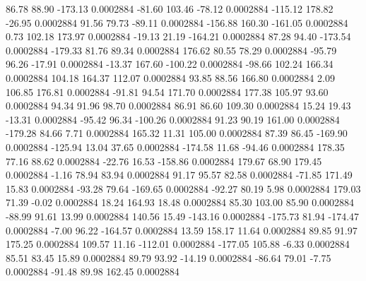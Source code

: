        86.78       88.90     -173.13     0.0002884
      -81.60      103.46      -78.12     0.0002884
     -115.12      178.82      -26.95     0.0002884
       91.56       79.73      -89.11     0.0002884
     -156.88      160.30     -161.05     0.0002884
        0.73      102.18      173.97     0.0002884
      -19.13       21.19     -164.21     0.0002884
       87.28       94.40     -173.54     0.0002884
     -179.33       81.76       89.34     0.0002884
      176.62       80.55       78.29     0.0002884
      -95.79       96.26      -17.91     0.0002884
      -13.37      167.60     -100.22     0.0002884
      -98.66      102.24      166.34     0.0002884
      104.18      164.37      112.07     0.0002884
       93.85       88.56      166.80     0.0002884
        2.09      106.85      176.81     0.0002884
      -91.81       94.54      171.70     0.0002884
      177.38      105.97       93.60     0.0002884
       94.34       91.96       98.70     0.0002884
       86.91       86.60      109.30     0.0002884
       15.24       19.43      -13.31     0.0002884
      -95.42       96.34     -100.26     0.0002884
       91.23       90.19      161.00     0.0002884
     -179.28       84.66        7.71     0.0002884
      165.32       11.31      105.00     0.0002884
       87.39       86.45     -169.90     0.0002884
     -125.94       13.04       37.65     0.0002884
     -174.58       11.68      -94.46     0.0002884
      178.35       77.16       88.62     0.0002884
      -22.76       16.53     -158.86     0.0002884
      179.67       68.90      179.45     0.0002884
       -1.16       78.94       83.94     0.0002884
       91.17       95.57       82.58     0.0002884
      -71.85      171.49       15.83     0.0002884
      -93.28       79.64     -169.65     0.0002884
      -92.27       80.19        5.98     0.0002884
      179.03       71.39       -0.02     0.0002884
       18.24      164.93       18.48     0.0002884
       85.30      103.00       85.90     0.0002884
      -88.99       91.61       13.99     0.0002884
      140.56       15.49     -143.16     0.0002884
     -175.73       81.94     -174.47     0.0002884
       -7.00       96.22     -164.57     0.0002884
       13.59      158.17       11.64     0.0002884
       89.85       91.97      175.25     0.0002884
      109.57       11.16     -112.01     0.0002884
     -177.05      105.88       -6.33     0.0002884
       85.51       83.45       15.89     0.0002884
       89.79       93.92      -14.19     0.0002884
      -86.64       79.01       -7.75     0.0002884
      -91.48       89.98      162.45     0.0002884

